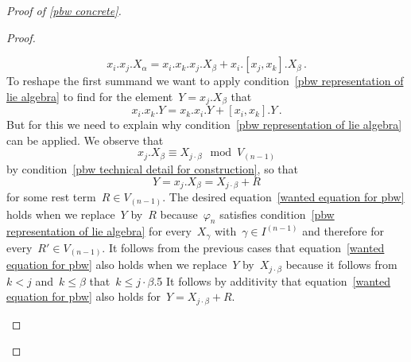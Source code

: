 \begin{proof}[Proof of \cref{pbw concrete}]
\begin{proof}
\begin{description}
        \begin{equation}
          \label{long equation}
          x_i.x_j.X_\alpha
          =
          x_i.x_k.x_j.X_\beta + x_i.[x_j,x_k].X_\beta \,.
        \end{equation}
        To reshape the first summand we want to apply condition~\ref*{pbw representation of lie algebra} to find for the element~$Y = x_j.X_\beta$ that
        \begin{equation}
          \label{wanted equation for pbw}
          x_i.x_k.Y
          =
            x_k.x_i.Y
          + [x_i, x_k].Y  \,.
        \end{equation}
        But for this we need to explain why condition~\ref*{pbw representation of lie algebra} can be applied.
        We observe that
        \[
          x_j.X_\beta
          \equiv
          X_{j \cdot \beta}
          \mod
          V_{(n-1)}
        \]
        by condition~\ref*{pbw technical detail for construction}, so that
        \[
          Y
          =
          x_j.X_\beta
          =
          X_{j \cdot \beta} + R 
        \]
        for some rest term~$R \in V_{(n-1)}$.
        The desired equation~\eqref{wanted equation for pbw} holds when we replace~$Y$ by~$R$ because~$\varphi_n$ satisfies condition~\ref*{pbw representation of lie algebra} for every~$X_\gamma$ with~$\gamma \in I^{(n-1)}$ and therefore for every~$R' \in V_{(n-1)}$.
        It follows from the previous cases that equation~\eqref{wanted equation for pbw} also holds when we replace~$Y$ by~$X_{j \cdot \beta}$ because it follows from~$k < j$ and~$k \leq \beta$ that~$k \leq j \cdot \beta$.5
        It follows by additivity that equation~\eqref{wanted equation for pbw} also holds for~$Y = X_{j \cdot \beta} + R$.
        

\end{description}
\end{proof}
\end{proof}
